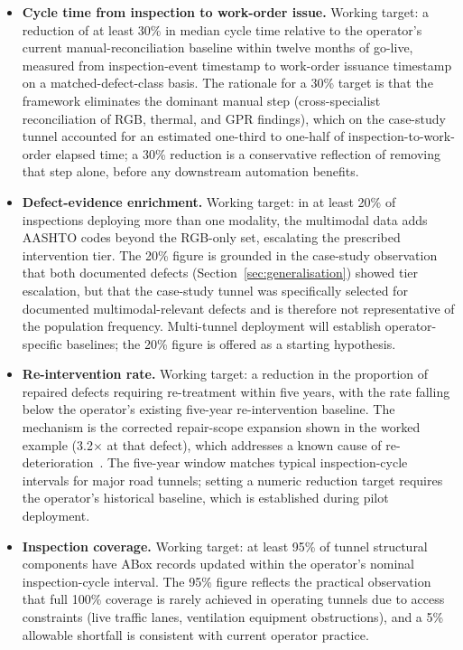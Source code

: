 \documentclass[11pt,a4paper]{article}
\begin{document}
\begin{itemize}[leftmargin=*]
\item \textbf{Cycle time from inspection to work-order issue.}
Working target: a reduction of at least 30\% in median cycle time relative to the operator's current manual-reconciliation baseline within twelve months of go-live, measured from inspection-event timestamp to work-order issuance timestamp on a matched-defect-class basis. The rationale for a 30\% target is that the framework eliminates the dominant manual step (cross-specialist reconciliation of RGB, thermal, and GPR findings), which on the case-study tunnel accounted for an estimated one-third to one-half of inspection-to-work-order elapsed time; a 30\% reduction is a conservative reflection of removing that step alone, before any downstream automation benefits.

\item \textbf{Defect-evidence enrichment.}
Working target: in at least 20\% of inspections deploying more than one modality, the multimodal data adds AASHTO codes beyond the RGB-only set, escalating the prescribed intervention tier. The 20\% figure is grounded in the case-study observation that both documented defects (Section~\ref{sec:generalisation}) showed tier escalation, but that the case-study tunnel was specifically selected for documented multimodal-relevant defects and is therefore not representative of the population frequency. Multi-tunnel deployment will establish operator-specific baselines; the 20\% figure is offered as a starting hypothesis.

\item \textbf{Re-intervention rate.}
Working target: a reduction in the proportion of repaired defects requiring re-treatment within five years, with the rate falling below the operator's existing five-year re-intervention baseline. The mechanism is the corrected repair-scope expansion shown in the worked example (3.2$\times$ at that defect), which addresses a known cause of re-deterioration~\citep{Watase2015}. The five-year window matches typical inspection-cycle intervals for major road tunnels; setting a numeric reduction target requires the operator's historical baseline, which is established during pilot deployment.

\item \textbf{Inspection coverage.}
Working target: at least 95\% of tunnel structural components have ABox records updated within the operator's nominal inspection-cycle interval. The 95\% figure reflects the practical observation that full 100\% coverage is rarely achieved in operating tunnels due to access constraints (live traffic lanes, ventilation equipment obstructions), and a 5\% allowable shortfall is consistent with current operator practice.
\end{itemize}
\end{document}
